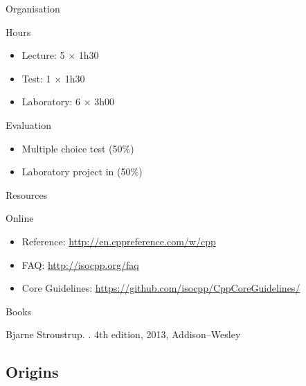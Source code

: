 \begin{frame}{Organisation}{}
  \begin{block}{Hours}
    \begin{itemize}
    \item
      Lecture: 5 $\times$ 1h30
    \item
      Test: 1 $\times$ 1h30
    \item
      Laboratory: 6 $\times$ 3h00
    \end{itemize}
  \end{block}

  \begin{block}{Evaluation}
    \begin{itemize}
    \item
      Multiple choice test (50\%)
    \item
      Laboratory project in \CCLang (50\%)
    \end{itemize}
  \end{block}
\end{frame}

\begin{frame}{Resources}{}
  \begin{block}{Online}
    \begin{itemize}
    \item
      \CCLang Reference: \url{http://en.cppreference.com/w/cpp}
    \item
      \CCLang FAQ: \url{http://isocpp.org/faq}
    \item
      \CCLang Core Guidelines: \url{https://github.com/isocpp/CppCoreGuidelines/}
    \end{itemize}
  \end{block}

  \begin{block}{Books}
    \begin{thebibliography}{}
      Bjarne Stroustrup.
      .
      \newblock 4th edition, 2013, Addison--Wesley
    \end{thebibliography}
  \end{block}
\end{frame}

\subsection{\CCLang Origins}


